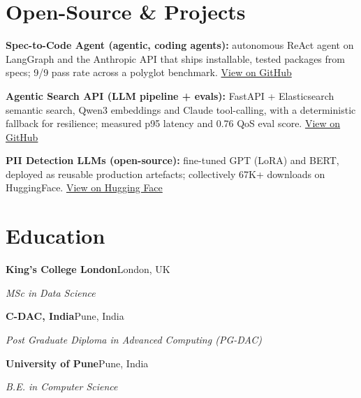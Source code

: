 \documentclass[10pt,a4paper]{article}
\begin{document}
\section{Open-Source \& Projects}
\begin{tight}
  \item \textbf{Spec-to-Code Agent (agentic, coding agents):} autonomous ReAct agent on LangGraph and the Anthropic API that ships installable, tested packages from specs; 9/9 pass rate across a polyglot benchmark. \href{https://github.com/abhijeetscode/Spec-to-Code-Agent}{View on GitHub}
  \item \textbf{Agentic Search API (LLM pipeline + evals):} FastAPI + Elasticsearch semantic search, Qwen3 embeddings and Claude tool-calling, with a deterministic fallback for resilience; measured p95 latency and 0.76 QoS eval score. \href{https://github.com/abhijeetscode/search-agent}{View on GitHub}
  \item \textbf{PII Detection LLMs (open-source):} fine-tuned GPT (LoRA) and BERT, deployed as reusable production artefacts; collectively 67K+ downloads on HuggingFace. \href{https://huggingface.co/ab-ai/pii_model}{View on Hugging Face}
\end{tight}

\section{Education}
{\color{company}\bfseries King's College London}\hfill {\color{muted}London, UK}\par
{\itshape MSc in Data Science}\par\vspace{2pt}
{\color{company}\bfseries C-DAC, India}\hfill {\color{muted}Pune, India}\par
{\itshape Post Graduate Diploma in Advanced Computing (PG-DAC)}\par\vspace{2pt}
{\color{company}\bfseries University of Pune}\hfill {\color{muted}Pune, India}\par
{\itshape B.E. in Computer Science}\par
\end{document}
